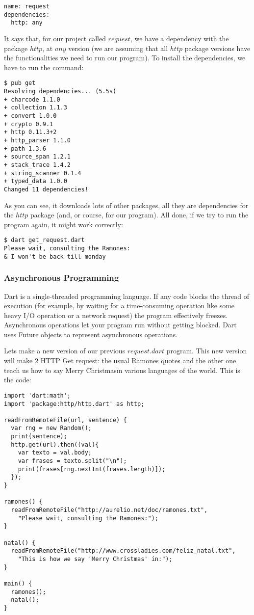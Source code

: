 \begin{verbatim}
name: request
dependencies:
  http: any
\end{verbatim}

It says that, for our project called $request$, we have a dependency with the
package $http$, at $any$ version (we are assuming that all $http$ package
versions have the functionalities we need to run our program). To install the
dependencies, we have to run the command:

\begin{verbatim}
$ pub get
Resolving dependencies... (5.5s)
+ charcode 1.1.0
+ collection 1.1.3
+ convert 1.0.0
+ crypto 0.9.1
+ http 0.11.3+2
+ http_parser 1.1.0
+ path 1.3.6
+ source_span 1.2.1
+ stack_trace 1.4.2
+ string_scanner 0.1.4
+ typed_data 1.0.0
Changed 11 dependencies!
\end{verbatim}

As you can see, it downloads lots of other packages, all they are dependencies
for the $http$ package (and, or course, for our program). All done, if we try to
run the program again, it might work correctly:

\begin{verbatim}
$ dart get_request.dart
Please wait, consulting the Ramones:
& I won't be back till monday
\end{verbatim}

\subsubsection{Asynchronous Programming}

Dart is a single-threaded programming language. If any code blocks the thread of
execution (for example, by waiting for a time-consuming operation like some
heavy I/O operation or a network request) the program effectively freezes. 
Asynchronous operations let your program run without getting blocked. Dart uses 
Future objects to represent asynchronous operations.

Lets make a new version of our previous $request.dart$ program. This new version
will make 2 HTTP Get request: the usual Ramones quotes and the other one teach
us how to say \"Merry Christmas\" in various languages of the world. This is the
code:

\begin{lstlisting}[label=dram,caption=Dart Making Asynchronous Requests]
import 'dart:math';
import 'package:http/http.dart' as http;

readFromRemoteFile(url, sentence) {
  var rng = new Random();
  print(sentence);
  http.get(url).then((val){
    var texto = val.body;
    var frases = texto.split("\n");
    print(frases[rng.nextInt(frases.length)]);
  });
}

ramones() {
  readFromRemoteFile("http://aurelio.net/doc/ramones.txt",
    "Please wait, consulting the Ramones:");
}

natal() {
  readFromRemoteFile("http://www.crossladies.com/feliz_natal.txt",
    "This is how we say 'Merry Christmas' in:");
}

main() {
  ramones();
  natal();
}
\end{lstlisting}

